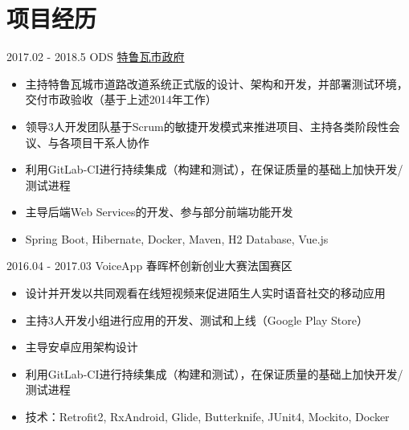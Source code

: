 \documentclass[letterpaper]{twentysecondcv} %
\begin{document}
\vspace{-0.2cm}
\section{项目经历}

\begin{twentyfluid}

    \twentyitemfluid
   		{2017.02 - 2018.5}
        {ODS}
        {\href{https://www.ville-troyes.fr/}{特鲁瓦市政府}}
        {\\   }
        {
        {
        \vspace{-0.2cm}
        \begin{itemize}
        	\item 主持特鲁瓦城市道路改道系统正式版的设计、架构和开发，并部署测试环境，交付市政验收（基于上述2014年工作）
        	\item 领导3人开发团队基于Scrum的敏捷开发模式来推进项目、主持各类阶段性会议、与各项目干系人协作
        	\item 利用GitLab-CI进行持续集成（构建和测试），在保证质量的基础上加快开发/测试进程
            \item 主导后端Web Services的开发、参与部分前端功能开发
        	\item Spring Boot, Hibernate, Docker, Maven, H2 Database, Vue.js
    	\end{itemize}}
        }
    
    \twentyitemfluid
    	{2016.04 - 2017.03}
        {VoiceApp}
        {春晖杯创新创业大赛法国赛区}
        {\\   }
        {
        {
        \vspace{-0.2cm}
        \begin{itemize}
        	\item 设计并开发以共同观看在线短视频来促进陌生人实时语音社交的移动应用
            \item 主持3人开发小组进行应用的开发、测试和上线（Google Play Store）
            \item 主导安卓应用架构设计
            \item 利用GitLab-CI进行持续集成（构建和测试），在保证质量的基础上加快开发/测试进程
            \item 技术：Retrofit2, RxAndroid, Glide, Butterknife, JUnit4, Mockito, Docker
        \end{itemize}}
        }

\end{twentyfluid}
\end{document}
